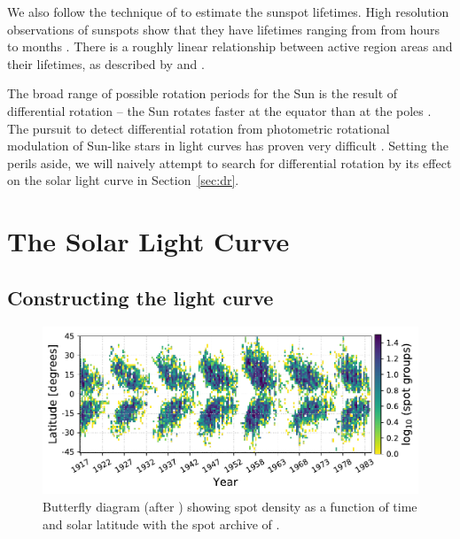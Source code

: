 We also follow the technique of \citet{Giles2017} to estimate the sunspot lifetimes. High resolution observations of sunspots show that they have lifetimes ranging from from hours to months \citep{Solanki2003}. There is a roughly linear relationship between active region areas and their lifetimes, as described by \citet{Gnevyshev1938} and \citet{Waldmeier1955} \cite[see also, for example, ][]{Petrovay1997}. 

The broad range of possible rotation periods for the Sun is the result of differential rotation -- the Sun rotates faster at the equator than at the poles \citep{Miesch2005}. The pursuit to detect differential rotation from photometric rotational modulation of Sun-like stars in \kepler light curves has proven very difficult \citep{Aigrain2015}. Setting the perils aside, we will naively attempt to search for differential rotation by its effect on the solar light curve in Section~\ref{sec:dr}.

\section{The Solar Light Curve} \label{sec:lc}

\subsection{Constructing the light curve}


\begin{figure}
    \centering
    \includegraphics[scale=0.9]{howard/butterfly.pdf}
    \caption{Butterfly diagram (after \citealt{Maunder1904}) showing spot density as a function of time and solar latitude with the spot archive of \citet{Howard1984}.}
    \label{fig:butterfly}
\end{figure}

